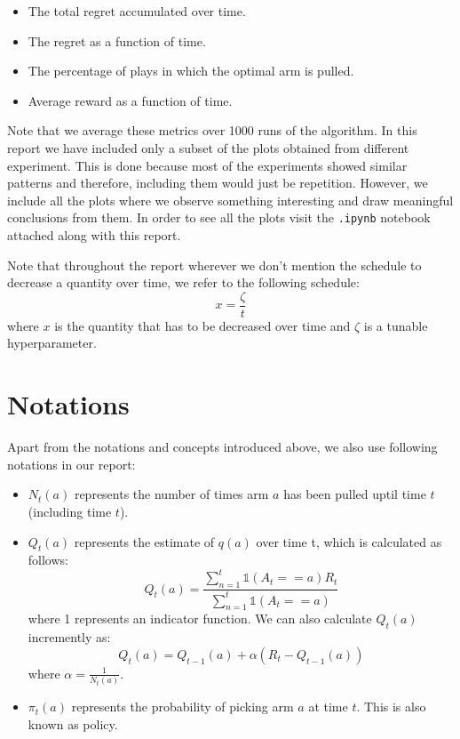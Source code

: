 \documentclass{article}
\begin{document}
	\begin{itemize}
		\item The total regret accumulated over time.
		\item The regret as a function of time.
		\item The percentage of plays in which the optimal arm is pulled.
		\item Average reward as a function of time.
	\end{itemize}
	
	Note that we average these metrics over 1000 runs of the algorithm. In this report we have included only a subset of the plots obtained from different experiment.
	This is done because most of the experiments showed similar patterns and therefore, including them would just be repetition. However, we include all the plots
	where we observe something interesting and draw meaningful conclusions from them. In order to see all the plots visit the \verb|.ipynb| notebook attached along
	with this report. \par
	
	\noindent %
	Note that throughout the report wherever we don't mention the schedule to decrease a quantity over time, we refer to the following schedule:
	\begin{equation}
		x = \frac{\zeta}{t}
	\label{default_schedule}
	\end{equation}
	where $x$ is the quantity that has to be decreased over time and $\zeta$ is a tunable hyperparameter.
	
\section{Notations}
	Apart from the notations and concepts introduced above, we also use following notations in our report:
	\begin{itemize}
		\item $N_{t}(a)$ represents the number of times arm $a$ has been pulled uptil time $t$ (including time $t$).
		
		\item $Q_{t}(a)$ represents the estimate of $q(a)$ over time t, which is calculated as follows:
				\begin{equation}
				\nonumber
					Q_{t}(a) = \frac{\sum_{n=1}^{t} \mathbb{1}(A_{t} == a) R_{t}}{\sum_{n=1}^{t} \mathbb{1}(A_{t} == a)}
				\end{equation}
				where 1 represents an indicator function. We can also calculate $Q_{t}(a)$ incremently as:
				\begin{equation}
				\nonumber
					Q_{t}(a) = Q_{t-1}(a) + \alpha (R_{t} - Q_{t-1}(a))
				\end{equation}
				where $\alpha = \frac{1}{N_{t}(a)}$.
				
		\item $\pi_{t}(a)$ represents the probability of picking arm $a$ at time $t$. This is also known as policy.
	\end{itemize}
	
\end{document}
